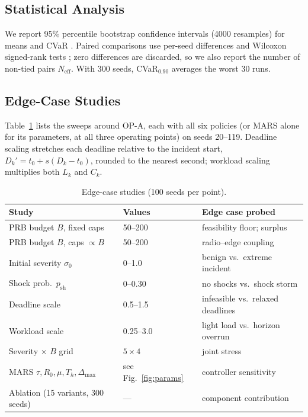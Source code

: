 \documentclass[conference]{IEEEtran}
\newcommand{\figref}[1]{Fig.~\ref{#1}}
\begin{document}
\subsection{Statistical Analysis}
We report 95\% percentile bootstrap confidence intervals (4000 resamples) for means and CVaR \cite{bootstrap}. Paired comparisons use per-seed differences and Wilcoxon signed-rank tests \cite{wilcoxon}; zero differences are discarded, so we also report the number of non-tied pairs $N_{\mathrm{eff}}$. With 300 seeds, CVaR$_{0.90}$ averages the worst 30 runs.

\subsection{Edge-Case Studies}
Table~\ref{tab:edge} lists the sweeps around OP-A, each with all six policies (or MARS alone for its parameters, at all three operating points) on seeds 20--119. Deadline scaling stretches each deadline relative to the incident start, $D_k'=t_0+s(D_k-t_0)$, rounded to the nearest second; workload scaling multiplies both $L_k$ and $C_k$.

\begin{table}[t]
\centering
\caption{Edge-case studies (100 seeds per point).}
\label{tab:edge}
\scriptsize
\begin{tabular}{lll}
\toprule
Study & Values & Edge case probed\\
\midrule
PRB budget $B$, fixed caps & 50--200 & feasibility floor; surplus\\
PRB budget $B$, caps $\propto B$ & 50--200 & radio--edge coupling\\
Initial severity $\sigma_0$ & 0--1.0 & benign vs.\ extreme incident\\
Shock prob.\ $p_{\mathrm{sh}}$ & 0--0.30 & no shocks vs.\ shock storm\\
Deadline scale & 0.5--1.5 & infeasible vs.\ relaxed deadlines\\
Workload scale & 0.25--3.0 & light load vs.\ horizon overrun\\
Severity $\times$ $B$ grid & $5\times4$ & joint stress\\
MARS $\tau,R_0,\mu,T_h,\Delta_{\max}$ & see \figref{fig:params} & controller sensitivity\\
Ablation (15 variants, 300 seeds) & --- & component contribution\\
\bottomrule
\end{tabular}
\end{table}
\end{document}
